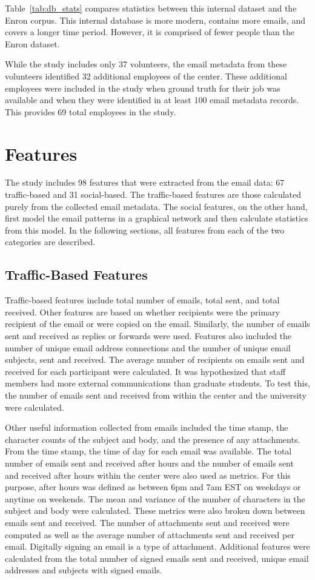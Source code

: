 \documentclass[12pt]{report}
\begin{document}
Table~\ref{tab:db_stats} compares statistics between this internal dataset and the Enron corpus.
This internal database is more modern, contains more emails, and covers a longer time period.
However, it is comprised of fewer people than the Enron dataset.

While the study includes only 37 volunteers, the email metadata from these volunteers identified 32 additional employees of the center.
These additional employees were included in the study when ground truth for their job was available and when they were identified in at least 100 email metadata records.
This provides 69 total employees in the study.

\section{Features}
The study includes 98 features that were extracted from the email data: 67 traffic-based and 31 social-based.
The traffic-based features are those calculated purely from the collected email metadata.
The social features, on the other hand, first model the email patterns in a graphical network and then calculate statistics from this model.
In the following sections, all features from each of the two categories are described. 

\subsection{Traffic-Based Features}
Traffic-based features include total number of emails, total sent, and total received.
Other features are based on whether recipients were the primary recipient of the email or were copied on the email.
Similarly, the number of emails sent and received as replies or forwards were used.
Features also included the number of unique email address connections and the number of unique email subjects, sent and received.
The average number of recipients on emails sent and received for each participant were calculated.
It was hypothesized that staff members had more external communications than graduate students.
To test this, the number of emails sent and received from within the center and the university were calculated.  

Other useful information collected from emails included the time stamp, the character counts of the subject and body, and the presence of any attachments.
From the time stamp, the time of day for each email was available.
The total number of emails sent and received after hours and the number of emails sent and received after hours within the center were also used as metrics.
For this purpose, after hours was defined as between 6pm and 7am EST on weekdays or anytime on weekends.
The mean and variance of the number of characters in the subject and body were calculated.
These metrics were also broken down between emails sent and received.
The number of attachments sent and received were computed as well as the average number of attachments sent and received per email.
Digitally signing an email is a type of attachment.
Additional features were calculated from the total number of signed emails sent and received, unique email addresses and subjects with signed emails.
\end{document}
